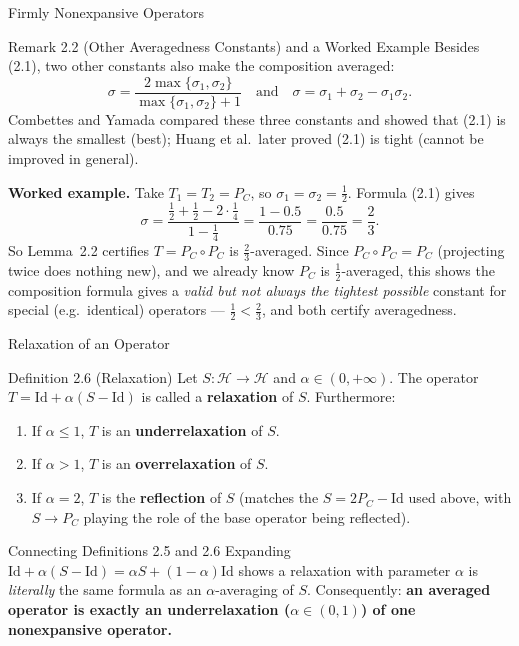 \documentclass[aspectratio=169,10pt]{beamer}
\newcommand{\Id}{\mathrm{Id}}
\begin{document}
\begin{frame}[allowframebreaks]{Firmly Nonexpansive Operators}
  \framebreak

  \begin{block}{Remark 2.2 (Other Averagedness Constants) and a Worked Example}
    Besides (2.1), two other constants also make the composition averaged:
    \[
      \sigma = \frac{2\max\{\sigma_1,\sigma_2\}}{\max\{\sigma_1,\sigma_2\}+1}
      \quad \text{and} \quad
      \sigma = \sigma_1 + \sigma_2 - \sigma_1\sigma_2.
    \]
    Combettes and Yamada compared these three constants and showed that (2.1)
    is always the smallest (best); Huang et al.\ later proved (2.1) is tight
    (cannot be improved in general).

    \medskip
    \textbf{Worked example.} Take $T_1 = T_2 = P_C$, so
    $\sigma_1=\sigma_2=\tfrac12$. Formula (2.1) gives
    \[
      \sigma = \frac{\tfrac12+\tfrac12 - 2\cdot\tfrac14}{1-\tfrac14}
             = \frac{1 - 0.5}{0.75} = \frac{0.5}{0.75} = \frac{2}{3}.
    \]
    So Lemma~2.2 certifies $T = P_C \circ P_C$ is $\tfrac23$-averaged. Since
    $P_C \circ P_C = P_C$ (projecting twice does nothing new), and we already
    know $P_C$ is $\tfrac12$-averaged, this shows the composition formula
    gives a \emph{valid but not always the tightest possible} constant for
    special (e.g.\ identical) operators --- $\tfrac12 < \tfrac23$, and both
    certify averagedness.
  \end{block}

\end{frame}

\begin{frame}[allowframebreaks]{Relaxation of an Operator}

  \begin{block}{Definition 2.6 (Relaxation)}
    Let $S : \mathcal{H} \to \mathcal{H}$ and $\alpha \in (0,+\infty)$. The
    operator $T = \Id + \alpha(S - \Id)$ is called a \textbf{relaxation} of
    $S$. Furthermore:
    \begin{enumerate}
      \item[(1)] If $\alpha \le 1$, $T$ is an \textbf{underrelaxation} of $S$.
      \item[(2)] If $\alpha > 1$, $T$ is an \textbf{overrelaxation} of $S$.
      \item[(3)] If $\alpha = 2$, $T$ is the \textbf{reflection} of $S$
        (matches the $S = 2P_C - \Id$ used above, with $S \to P_C$ playing
        the role of the base operator being reflected).
    \end{enumerate}
  \end{block}

  \begin{block}{Connecting Definitions 2.5 and 2.6}
    Expanding $\Id + \alpha(S-\Id) = \alpha S + (1-\alpha)\Id$ shows a
    relaxation with parameter $\alpha$ is \emph{literally} the same formula as
    an $\alpha$-averaging of $S$. Consequently: \textbf{an averaged operator is
    exactly an underrelaxation ($\alpha \in (0,1)$) of one nonexpansive
    operator.}
  \end{block}

\end{frame}
\end{document}
